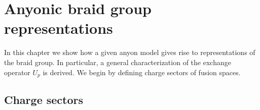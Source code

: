\documentclass[a4paper,10pt,oneside]{book}
\theoremstyle{plain}
\theoremstyle{definition}
\theoremstyle{remark}
\begin{document}
\clearpage






































































\chapter{Anyonic braid group representations}

In this chapter we show how a given anyon model gives rise to representations of the braid group. In particular, a general characterization of the exchange operator $U_p$ is derived. We begin by defining charge sectors of fusion spaces.


\section{Charge sectors}\label{sec:charge sectors}
\end{document}
